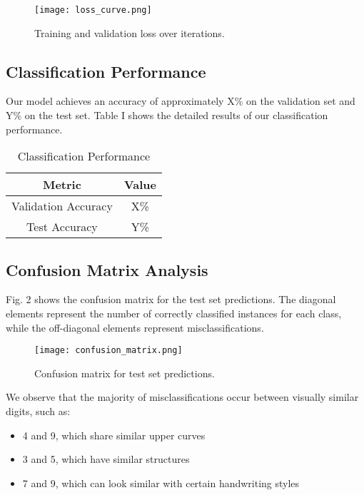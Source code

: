 \documentclass[10pt,journal,compsoc]{IEEEtran}
\begin{document}
\begin{figure}[htbp]
\centering
\texttt{[image: loss\_curve.png]}
\caption{Training and validation loss over iterations.}
\label{fig:loss_curve}
\end{figure}

\subsection{Classification Performance}
Our model achieves an accuracy of approximately X\% on the validation set and Y\% on the test set. Table I shows the detailed results of our classification performance.

\begin{table}[htbp]
\caption{Classification Performance}
\begin{center}
\begin{tabular}{|c|c|}
\hline
\textbf{Metric} & \textbf{Value} \\
\hline
Validation Accuracy & X\% \\
\hline
Test Accuracy & Y\% \\
\hline
\end{tabular}
\end{center}
\label{tab:performance}
\end{table}

\subsection{Confusion Matrix Analysis}
Fig. 2 shows the confusion matrix for the test set predictions. The diagonal elements represent the number of correctly classified instances for each class, while the off-diagonal elements represent misclassifications.

\begin{figure}[htbp]
\centering
\texttt{[image: confusion\_matrix.png]}
\caption{Confusion matrix for test set predictions.}
\label{fig:confusion_matrix}
\end{figure}

We observe that the majority of misclassifications occur between visually similar digits, such as:
\begin{itemize}
    \item 4 and 9, which share similar upper curves
    \item 3 and 5, which have similar structures
    \item 7 and 9, which can look similar with certain handwriting styles
\end{itemize}
\end{document}
